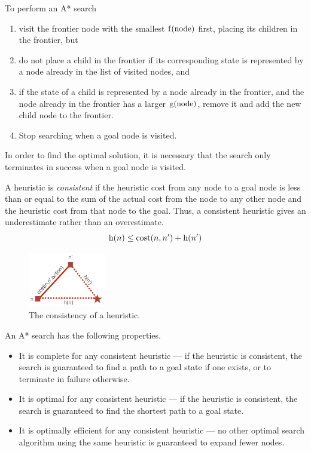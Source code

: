 To perform an A* search
\begin{enumerate}
  \item visit the frontier node with the smallest \( \mathrm{f}\!\left( \text{node} \right) \) first, placing its children in the frontier, but
  \item do not place a child in the frontier if its corresponding state is represented by a node already in the list of visited nodes, and
  \item if the state of a child is represented by a node already in the frontier, and the node already in the frontier has a larger \( \mathrm{g}\!\left( \text{node} \right) \), remove it and add the new child node to the frontier.
  \item Stop searching when a goal node is visited.
\end{enumerate}

In order to find the optimal solution, it is necessary that the search only terminates in success when a goal node is visited.

A heuristic is \emph{consistent} if the heuristic cost from any node to a goal node is less than or equal to the sum of the actual cost from the node to any other node and the heuristic cost from that node to the goal.
Thus, a consistent heuristic gives an underestimate rather than an overestimate.
\begin{equation*}
  \mathrm{h}\!\left( n \right) \leq \mathrm{\text{cost}}\!\left( n, n' \right) + \mathrm{h}\!\left( n' \right)
\end{equation*}

\begin{figure}[htp]
  \centering
  \includegraphics[width=0.3\textwidth]{unit-9/figures/heuristic-consistency.jpg}
  \caption*{The consistency of a heuristic.}
\end{figure}

An A* search has the following properties.
\begin{itemize}
  \item It is complete for any consistent heuristic --- if the heuristic is consistent, the search is guaranteed to find a path to a goal state if one exists, or to terminate in failure otherwise.
  \item It is optimal for any consistent heuristic --- if the heuristic is consistent, the search is guaranteed to find the shortest path to a goal state.
  \item It is optimally efficient for any consistent heuristic --- no other optimal search algorithm using the same heuristic is guaranteed to expand fewer nodes.
\end{itemize}

